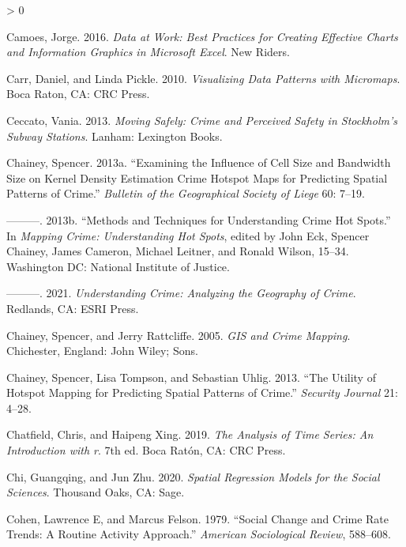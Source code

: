 \documentclass[
  krantz2]{krantz}
\newlength{\cslhangindent}
\newenvironment{CSLReferences}[2] %
 {%
  \setlength{\parindent}{0pt}
  \ifodd #1 \everypar{\setlength{\hangindent}{\cslhangindent}}\ignorespaces\fi
  \ifnum #2 > 0
  \setlength{\parskip}{#2\baselineskip}
  \fi
 }%
 {}
\begin{document}
\begin{CSLReferences}{1}{0}
\leavevmode\hypertarget{ref-Camoes_2016}{}%
Camoes, Jorge. 2016. \emph{Data at Work: Best Practices for Creating Effective Charts and Information Graphics in Microsoft Excel}. New Riders.

\leavevmode\hypertarget{ref-Carr_2010}{}%
Carr, Daniel, and Linda Pickle. 2010. \emph{Visualizing Data Patterns with Micromaps}. Boca Raton, CA: CRC Press.

\leavevmode\hypertarget{ref-Ceccato_2013}{}%
Ceccato, Vania. 2013. \emph{Moving Safely: Crime and Perceived Safety in Stockholm's Subway Stations}. Lanham: Lexington Books.

\leavevmode\hypertarget{ref-Chainey_2013a}{}%
Chainey, Spencer. 2013a. {``Examining the Influence of Cell Size and Bandwidth Size on Kernel Density Estimation Crime Hotspot Maps for Predicting Spatial Patterns of Crime.''} \emph{Bulletin of the Geographical Society of Liege} 60: 7--19.

\leavevmode\hypertarget{ref-Chainey_2013b}{}%
---------. 2013b. {``Methods and Techniques for Understanding Crime Hot Spots.''} In \emph{Mapping Crime: Understanding Hot Spots}, edited by John Eck, Spencer Chainey, James Cameron, Michael Leitner, and Ronald Wilson, 15--34. Washington DC: National Institute of Justice.

\leavevmode\hypertarget{ref-Chainey_2021}{}%
---------. 2021. \emph{Understanding Crime: Analyzing the Geography of Crime}. Redlands, CA: ESRI Press.

\leavevmode\hypertarget{ref-Chainey_2005}{}%
Chainey, Spencer, and Jerry Rattcliffe. 2005. \emph{GIS and Crime Mapping}. Chichester, England: John Wiley; Sons.

\leavevmode\hypertarget{ref-Chainey_2008}{}%
Chainey, Spencer, Lisa Tompson, and Sebastian Uhlig. 2013. {``The Utility of Hotspot Mapping for Predicting Spatial Patterns of Crime.''} \emph{Security Journal} 21: 4--28.

\leavevmode\hypertarget{ref-Chatfield_2019}{}%
Chatfield, Chris, and Haipeng Xing. 2019. \emph{The Analysis of Time Series: An Introduction with r}. 7th ed. Boca Ratón, CA: CRC Press.

\leavevmode\hypertarget{ref-Chi_2020}{}%
Chi, Guangqing, and Jun Zhu. 2020. \emph{Spatial Regression Models for the Social Sciences}. Thousand Oaks, CA: Sage.

\leavevmode\hypertarget{ref-Cohen_1979}{}%
Cohen, Lawrence E, and Marcus Felson. 1979. {``Social Change and Crime Rate Trends: A Routine Activity Approach.''} \emph{American Sociological Review}, 588--608.


\end{CSLReferences}
\end{document}
